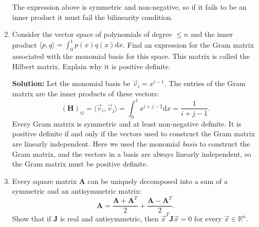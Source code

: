 \documentclass[11pt,fleqn]{article}
\begin{document}
\begin{enumerate}
The expression above is symmetric and non-negative, so if it fails to be an inner product it must fail the bilinearity condition.
\item Consider the vector space of polynomials of degree $\le n$ and the inner product $\langle p,q\rangle = \int_0^1 p(x)q(x)\mathrm{d}x$. Find an expression for the Gram matrix associated with the monomial basis for this space. This matrix is called the Hilbert matrix. Explain why it is positive definite.

{\bf Solution:} Let the monomial basis be $\vec{v}_i = x^{i-1}$. The entries of the Gram matrix are the inner products of these vectors:
\[\left(\mathbf{H}\right)_{ij} = \langle\vec{v}_i,\vec{v}_j\rangle = \int_0^1x^{i+j-2}\mathrm{d}x = \frac{1}{i+j-1}.\]
Every Gram matrix is symmetric and at least non-negative definite. It is positive definite if and only if the vectors used to construct the Gram matrix are linearly independent. Here we used the monomial {\it basis} to construct the Gram matrix, and the vectors in a basis are always linearly independent, so the Gram matrix must be positive definite.
%
%

\item Every square matrix $\mathbf{A}$ can be uniquely decomposed into a sum of a symmetric and an antisymmetric matrix:
\[\mathbf{A} = \frac{\mathbf{A}+\mathbf{A}^T}{2} + \frac{\mathbf{A} - \mathbf{A}^T}{2}.\]
Show that if $\mathbf{J}$ is real and antisymmetric, then $\vec{x}^T\mathbf{J}\vec{x} = 0$ for every $\vec{x}\in\mathbb{R}^n$.


\end{enumerate}
\end{document}

